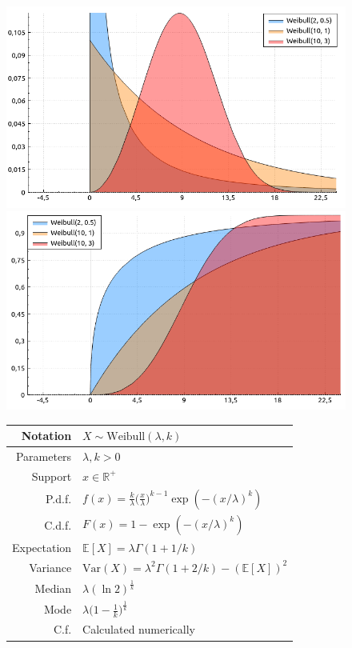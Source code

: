 \documentclass[a4paper,11pt]{article}
\theoremstyle{plain}
\theoremstyle{definition}
\newcommand{\ME}{\mathbb{E}}
\newcommand{\MR}{\mathbb{R}}
\newcommand{\Var}{\mathrm{Var}}
\begin{document}
\begin{figure}[!htb]\centering
	\begin{minipage}{0.55\textwidth}
		\includegraphics[width=\linewidth, right]{weibull_pdf}
		\captionsetup{labelformat=empty}
		\includegraphics[width=\linewidth, right]{weibull_cdf}
		\captionsetup{labelformat=empty}
	\end{minipage}
	\begin{minipage}{0.4\textwidth}
		\begin{tabular}{| r | l |}
			\hline
			Notation & $X \sim \mathrm{Weibull}(\lambda, k)$ \\
			\hline
			Parameters & $\lambda, k > 0 $ \\
			\hline
			Support & $x \in \MR^+$  \\
			\hline
			P.d.f. & $f(x)= \frac{k}{\lambda}\big( \frac{x}{\lambda}\big)^{k-1} \exp(-(x/\lambda)^k)  $ \\
			\hline
			C.d.f. & $F(x)= 1-\exp(-(x/\lambda)^k) $ \\
			\hline
			Expectation & $\ME[X] = \lambda \Gamma(1+1/k)$ \\
			\hline
			Variance & $\Var(X) = \lambda^2 \Gamma(1+2/k) - (\ME[X])^2$ \\
			\hline
			Median & $\lambda (\ln2)^{\frac{1}{k}}$ \\
			\hline
			Mode & $\lambda \big( 1-\frac{1}{k} \big)^{\frac{1}{k}}$ \\
			\hline
			C.f. & Calculated numerically \\
			\hline
		\end{tabular}
	\end{minipage}
\end{figure}
\end{document}
